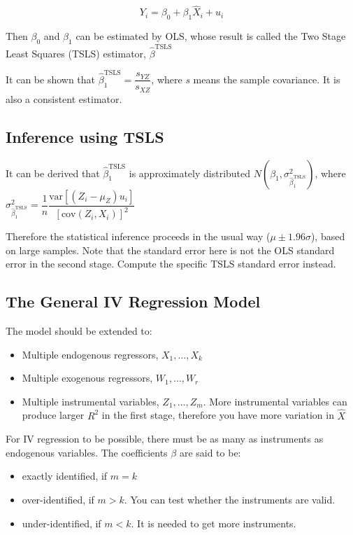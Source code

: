 \documentclass{article}
\begin{document}
\[
	Y_i = \beta_0 + \beta_1 \hat{X}_i + u_i
\]

Then $\beta_0$ and $\beta_1$ can be estimated by OLS, whose result is called the Two Stage Least Squares (TSLS) estimator,
$\hat{\beta}^{\text{TSLS}}$

It can be shown that $\hat{\beta}_1^{\text{TSLS}} = \dfrac{s_{YZ}}{s_{XZ}}$,
where $s$ means the sample covariance. It is also a consistent estimator.

\subsection{Inference using TSLS}

It can be derived that $\hat{\beta}_1 ^{\text{TSLS}}$ is approximately distributed $N(\beta_1, \sigma^2_{
	\hat{\beta}_1^{\text{TSLS}}
})$, where $\sigma^2_{
	\hat{\beta}_1^{\text{TSLS}}
} = \dfrac{1}{n} \dfrac{
	\text{var}\left[ (Z_i - \mu_Z) u_i \right]
}{
	\left[ \text{cov} (Z_i, X_i) \right] ^ 2
}$

Therefore the statistical inference proceeds in the usual way ($\mu \pm 1.96 \sigma$), based on large samples.
Note that the standard error here is not the OLS standard error in the second stage.
Compute the specific TSLS standard error instead.


\subsection{The General IV Regression Model}

The model should be extended to:
\begin{itemize}
	\item Multiple endogenous regressors, $X_1, \ldots, X_k$
	\item Multiple exogenous regressors, $W_1, \ldots, W_r$
	\item Multiple instrumental variables, $Z_1, \ldots, Z_m$.
					More instrumental variables can produce larger $R^2$ in the first stage,
					therefore you have more variation in $\hat{X}$
\end{itemize}

For IV regression to be possible, there must be as many as instruments as endogenous variables.
The coefficients $\beta$ are said to be:
\begin{itemize}
	\item exactly identified, if $m=k$
	\item over-identified, if $m>k$. You can test whether the instruments are valid.
	\item under-identified, if $m<k$. It is needed to get more instruments.
\end{itemize}
\end{document}
